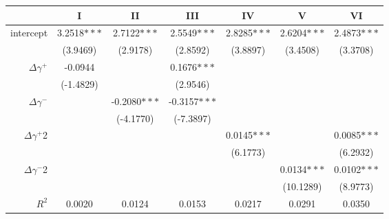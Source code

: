 \begin{tabular}{rSSSSSS}
\toprule
{} &            I &            II &           III &           IV &            V &           VI \\
\midrule
intercept &  3.2518$***$ &   2.7122$***$ &   2.5549$***$ &  2.8285$***$ &  2.6204$***$ &  2.4873$***$ \\
          &     (3.9469) &      (2.9178) &      (2.8592) &     (3.8897) &     (3.4508) &     (3.3708) \\
$\Delta \gamma^+$       &      -0.0944 &               &   0.1676$***$ &              &              &              \\
          &    (-1.4829) &               &      (2.9546) &              &              &              \\
$\Delta \gamma^-$       &              &  -0.2080$***$ &  -0.3157$***$ &              &              &              \\
          &              &     (-4.1770) &     (-7.3897) &              &              &              \\
$\Delta \gamma^+$2      &              &               &               &  0.0145$***$ &              &  0.0085$***$ \\
          &              &               &               &     (6.1773) &              &     (6.2932) \\
$\Delta \gamma^-$2      &              &               &               &              &  0.0134$***$ &  0.0102$***$ \\
          &              &               &               &              &    (10.1289) &     (8.9773) \\
\midrule
$R^2$ & 0.0020 & 0.0124 & 0.0153 & 0.0217 & 0.0291 & 0.0350\\\bottomrule
\end{tabular}
